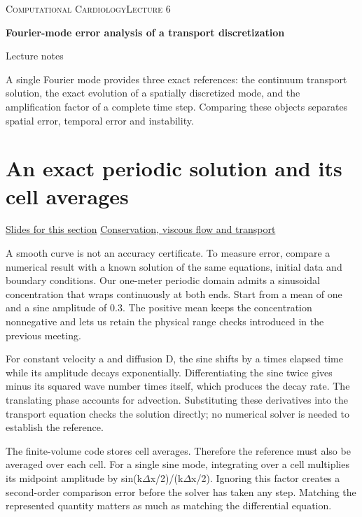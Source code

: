 \documentclass[11pt,letterpaper]{article}
\theoremstyle{definition}\newtheorem{definition}{Definition}\newtheorem{example}{Example}
\numberwithin{equation}{section}
\begin{document}
{\small\scshape Computational Cardiology\hfill Lecture 6}\par\medskip
{\raggedright{}\LARGE\bfseries\color{ink} Fourier-mode error analysis of a transport discretization\par}\medskip
{\small Lecture notes}\par\bigskip
A single Fourier mode provides three exact references: the continuum transport solution, the exact evolution of a spatially discretized mode, and the amplification factor of a complete time step. Comparing these objects separates spatial error, temporal error and instability.

\section{An exact periodic solution and its cell averages}
\hypertarget{note-an-exact-periodic-solution-and-its-cell-averages}{}\label{note:an-exact-periodic-solution-and-its-cell-averages}
{\small \href{slides.html\#frame=a-continuum-transport-mode\&step=1}{Slides for this section} \quad \href{../modules/cfd/index.html}{Conservation, viscous flow and transport}}\par
A smooth curve is not an accuracy certificate. To measure error, compare a numerical result with a known solution of the same equations, initial data and boundary conditions. Our one-meter periodic domain admits a sinusoidal concentration that wraps continuously at both ends. Start from a mean of one and a sine amplitude of 0.3. The positive mean keeps the concentration nonnegative and lets us retain the physical range checks introduced in the previous meeting.

For constant velocity a and diffusion D, the sine shifts by a times elapsed time while its amplitude decays exponentially. Differentiating the sine twice gives minus its squared wave number times itself, which produces the decay rate. The translating phase accounts for advection. Substituting these derivatives into the transport equation checks the solution directly; no numerical solver is needed to establish the reference.

The finite-volume code stores cell averages. Therefore the reference must also be averaged over each cell. For a single sine mode, integrating over a cell multiplies its midpoint amplitude by sin(k\ensuremath{\Delta}x/2)/(k\ensuremath{\Delta}x/2). Ignoring this factor creates a second-order comparison error before the solver has taken any step. Matching the represented quantity matters as much as matching the differential equation.
\end{document}

